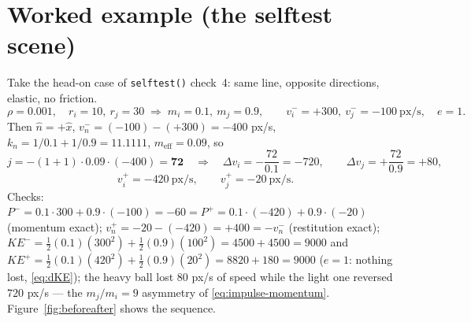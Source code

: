 \documentclass[a4paper,11pt]{article}
\newcommand{\hh}{\hat{n}}
\begin{document}
\section{Worked example (the selftest scene)}

Take the head-on case of \texttt{selftest()} check~4: same line, opposite
directions, elastic, no friction.
\[
  \rho=0.001,\quad r_i=10,\ r_j=30
  \;\Rightarrow\; m_i=0.1,\ m_j=0.9,
  \qquad v_i^{-}=+300,\ v_j^{-}=-100\ \text{px/s},\quad e=1 .
\]
Then $\hh=+\hat x$, $v_n^{-}=(-100)-(+300)=-400$ px/s,
$k_n=1/0.1+1/0.9=11.1111$, $m_{\text{eff}}=0.09$, so
\[
  j=-(1+1)\cdot0.09\cdot(-400)=\mathbf{72}
  \quad\Rightarrow\quad
  \Delta v_i=-\frac{72}{0.1}=-720,\qquad
  \Delta v_j=+\frac{72}{0.9}=+80,
\]
\[
  v_i^{+}=-420\ \text{px/s},\qquad v_j^{+}=-20\ \text{px/s}.
\]
Checks: $P^{-}=0.1\cdot300+0.9\cdot(-100)=-60=P^{+}=0.1\cdot(-420)+0.9\cdot(-20)$
(momentum exact); $v_n^{+}=-20-(-420)=+400=-v_n^{-}$ (restitution exact);
$KE^{-}=\tfrac12(0.1)(300^2)+\tfrac12(0.9)(100^2)=4500+4500=9000$ and
$KE^{+}=\tfrac12(0.1)(420^2)+\tfrac12(0.9)(20^2)=8820+180=9000$
($e=1$: nothing lost, \eqref{eq:dKE}); the heavy ball lost $80$ px/s of speed
while the light one reversed $720$ px/s --- the $m_j/m_i=9$ asymmetry of
\eqref{eq:impulse-momentum}. Figure~\ref{fig:beforeafter} shows the sequence.
\end{document}

